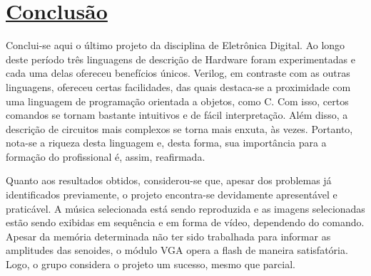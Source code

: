 \documentclass[14pt, oneside]{book}
\newcommand\tab[1][1cm]{\hspace*{#1}}
\theoremstyle{definition}
\begin{document}
        \chapter[Conclusão]{\hyperlink{toc}{Conclusão}}
            \tab Conclui-se aqui o último projeto da disciplina de Eletrônica Digital. Ao longo deste período três linguagens de descrição de Hardware foram experimentadas e cada uma delas ofereceu benefícios únicos. Verilog, em contraste com as outras linguagens, ofereceu certas facilidades, das quais destaca-se a proximidade com uma linguagem de programação orientada a objetos, como C. Com isso, certos comandos se tornam bastante intuitivos e de fácil interpretação. Além disso, a descrição de circuitos mais complexos se torna mais enxuta, às vezes. Portanto, nota-se a riqueza desta linguagem e, desta forma, sua importância para a formação do profissional é, assim, reafirmada.
            
             Quanto aos resultados obtidos, considerou-se que, apesar dos problemas já identificados previamente, o projeto encontra-se devidamente apresentável e praticável. A música selecionada está sendo reproduzida e as imagens selecionadas estão sendo exibidas em sequência e em forma de vídeo, dependendo do comando. Apesar da memória determinada não ter sido trabalhada para informar as amplitudes das senoides, o módulo VGA opera a flash de maneira satisfatória. Logo, o grupo considera o projeto um sucesso, mesmo que parcial. 
                    
\end{document}
